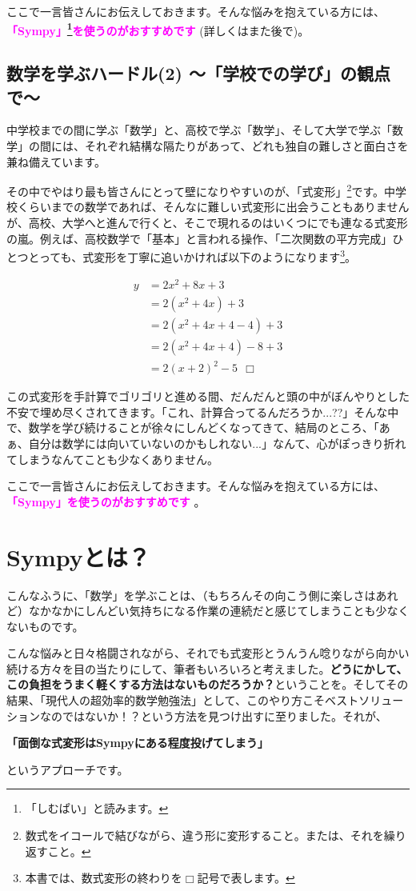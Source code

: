 \documentclass[9pt, a5paper,dvipdfmx]{jsbook}
\begin{document}
ここで一言皆さんにお伝えしておきます。そんな悩みを抱えている方には、
\textcolor{magenta}{
{\bf 「Sympy」\footnote{「しむぱい」と読みます。}を使うのがおすすめです}
}
(詳しくはまた後で)。

\subsection{数学を学ぶハードル(2) 〜「学校での学び」の観点で〜}
中学校までの間に学ぶ「数学」と、高校で学ぶ「数学」、そして大学で学ぶ「数学」の間には、それぞれ結構な隔たりがあって、どれも独自の難しさと面白さを兼ね備えています。

その中でやはり最も皆さんにとって壁になりやすいのが、「式変形」\footnote{数式をイコールで結びながら、違う形に変形すること。または、それを繰り返すこと。}です。中学校くらいまでの数学であれば、そんなに難しい式変形に出会うこともありませんが、高校、大学へと進んで行くと、そこで現れるのはいくつにでも連なる式変形の嵐。例えば、高校数学で「基本」と言われる操作、「二次関数の平方完成」ひとつとっても、式変形を丁寧に追いかければ以下のようになります\footnote{本書では、数式変形の終わりを$\Box$記号で表します。}。

\large
\begin{align*}
   y &= 2x^2 + 8x + 3\\
    &= 2(x^2+4x)+3\\
    &= 2(x^2+4x+4-4)+3\\
    &= 2(x^2+4x+4)-8+3\\
    &= 2(x+2)^2-5\ \ \Box
\end{align*}
\normalsize

この式変形を手計算でゴリゴリと進める間、だんだんと頭の中がぼんやりとした不安で埋め尽くされてきます。「これ、計算合ってるんだろうか...??」そんな中で、数学を学び続けることが徐々にしんどくなってきて、結局のところ、「あぁ、自分は数学には向いていないのかもしれない...」なんて、心がぽっきり折れてしまうなんてことも少なくありません。

ここで一言皆さんにお伝えしておきます。そんな悩みを抱えている方には、
\textcolor{magenta}{
{\bf 「Sympy」を使うのがおすすめです}
}
。
\section{Sympyとは？}
こんなふうに、「数学」を学ぶことは、（もちろんその向こう側に楽しさはあれど）なかなかにしんどい気持ちになる作業の連続だと感じてしまうことも少なくないものです。

こんな悩みと日々格闘されながら、それでも式変形とうんうん唸りながら向かい続ける方々を目の当たりにして、筆者もいろいろと考えました。{\bf どうにかして、この負担をうまく軽くする方法はないものだろうか？}ということを。そしてその結果、「現代人の超効率的数学勉強法」として、このやり方こそベストソリューションなのではないか！？という方法を見つけ出すに至りました。それが、
\large
\begin{center}
{\bf 「面倒な式変形はSympyにある程度投げてしまう」}
\end{center}
\normalsize
というアプローチです。
\end{document}

